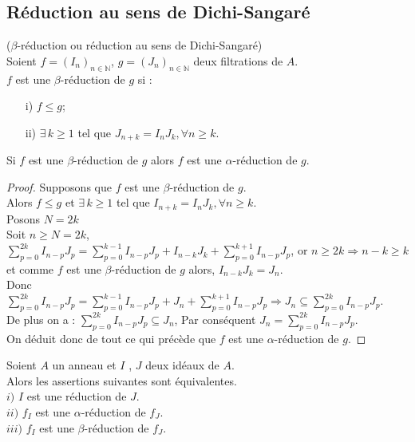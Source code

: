 \subsection{Réduction au sens de Dichi-Sangaré}
\begin{madefinition}
	($\beta$-réduction ou réduction au sens de Dichi-Sangaré)\\
	Soient $f = (I_n)_{n \in \mathbb{N}}$, $g = (J_n)_{n \in \mathbb{N}}$ deux filtrations de $A$.\\
	$f$ est une $\beta$-réduction de $g$ si : \\
	\begin{enumerate}
		\item[i)] $f \leq g$;
		\item[ii)]  $\exists \, k \geq 1$ tel que $J_{n+k} = I_n J_k , \forall n \geq k$.
	\end{enumerate}
\end{madefinition}
\begin{maremarque}
	Si $f$ est une $\beta$-réduction de $g$ alors $f$ est une $\alpha$-réduction de $g$.\\	
\end{maremarque}
\begin{proof}
	Supposons que $f$ est une $\beta$-réduction de $g$.\\
	Alors $f \leq g$ et $\exists \, k \geq 1$ tel que $I_{n+k} = I_n J_k , \forall n \geq k$.\\
	Posons $N = 2k$\\
	Soit $n \geq N= 2k$,\\
	$\displaystyle \sum_{p=0}^{2k}{I_{n-p} J_{p}} = \displaystyle \sum_{p=0}^{k-1}{I_{n-p} J_{p}} + I_{n-k} J_k + \displaystyle \sum_{p=0}^{k+1}{I_{n-p} J_{p}}$, or $n \geq  2k \Rightarrow n-k \geq k$ et comme $f$ est une $\beta$-réduction de $g$ alors, $I_{n-k} J_k = J_n$.\\
	Donc $\displaystyle \sum_{p=0}^{2k}{I_{n-p} J_{p}} = \displaystyle \sum_{p=0}^{k-1}{I_{n-p} J_{p}} + J_n + \displaystyle \sum_{p=0}^{k+1}{I_{n-p} J_{p}} \Rightarrow J_n \subseteq \displaystyle \sum_{p=0}^{2k}{I_{n-p} J_{p}}$.\\
	De plus on a : $\displaystyle \sum_{p=0}^{2k}{I_{n-p} J_{p}} \subseteq J_n$, 
	Par conséquent $J_n = \displaystyle \sum_{p=0}^{2k}{I_{n-p} J_{p}}$.\\
	On déduit donc de tout ce qui précède que $f$ est une $\alpha$-réduction de $g$.
\end{proof}
\begin{maproposition}
	Soient $A$ un anneau et $I$ , $J$ deux idéaux de $A$.\\
	Alors les assertions suivantes sont équivalentes.\\
	$i)$ $I$ est une réduction de $J$.\\
	$ii)$ $f_I$ est une $\alpha$-réduction de $f_J$.\\
	$iii)$ $f_I$ est une $\beta$-réduction de $f_J$.
\end{maproposition}

